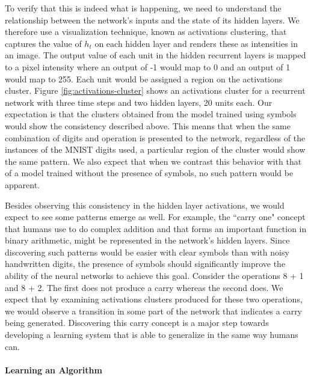 To verify that this is indeed what is happening, we need to understand the relationship between the network's inputs and the state of its hidden layers. We therefore use a visualization technique, known as activations clustering, that captures the value of $h_t$ on each hidden layer and renders these as intensities in an image. The output value of each unit in the hidden recurrent layers is mapped to a pixel intensity where an output of -1 would map to 0 and an output of 1 would map to 255. Each unit would be assigned a region on the activations cluster. Figure \ref{fig:activations-cluster} shows an activations cluster for a recurrent network with three time steps and two hidden layers, 20 units each. Our expectation is that the clusters obtained from the model trained using symbols would show the consistency described above. This means that when the same combination of digits and operation is presented to the network, regardless of the instances of the MNIST digits used, a particular region of the cluster would show the same pattern. We also expect that when we contrast this behavior with that of a model trained without the presence of symbols, no such pattern would be apparent.

Besides observing this consistency in the hidden layer activations, we would expect to see some patterns emerge as well. For example, the ``carry one" concept that humans use to do complex addition and that forms an important function in binary arithmetic, might be represented in the network's hidden layers. Since discovering such patterns would be easier with clear symbols than with noisy handwritten digits, the presence of symbols should significantly improve the ability of the neural networks to achieve this goal. Consider the operations 8 + 1 and 8 + 2. The first does not produce a carry whereas the second does. We expect that by examining activations clusters produced for these two operations, we would observe a transition in some part of the network that indicates a carry being generated. Discovering this carry concept is a major step towards developing a learning system that is able to generalize in the same way humans can.

\paragraph{Learning an Algorithm}

